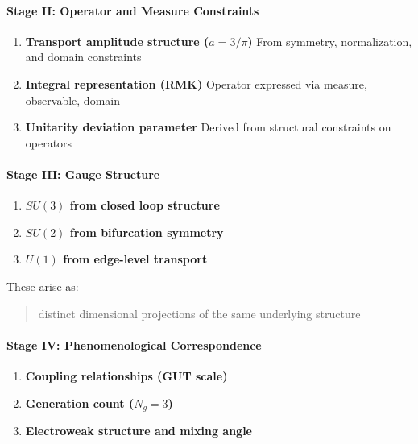 \documentclass[
]{article}
\providecommand{\tightlist}{%
  \setlength{\itemsep}{0pt}\setlength{\parskip}{0pt}}
\begin{document}
\hypertarget{stage-ii-operator-and-measure-constraints}{%
\paragraph{Stage II: Operator and Measure
Constraints}\label{stage-ii-operator-and-measure-constraints}}

\begin{enumerate}
\def\labelenumi{\arabic{enumi}.}
\setcounter{enumi}{4}
\item
  \textbf{Transport amplitude structure (\(a = 3/\pi\))} From symmetry,
  normalization, and domain constraints
\item
  \textbf{Integral representation (RMK)} Operator expressed via measure,
  observable, domain
\item
  \textbf{Unitarity deviation parameter} Derived from structural
  constraints on operators
\end{enumerate}

\hypertarget{stage-iii-gauge-structure}{%
\paragraph{Stage III: Gauge Structure}\label{stage-iii-gauge-structure}}

\begin{enumerate}
\def\labelenumi{\arabic{enumi}.}
\setcounter{enumi}{7}
\tightlist
\item
  \textbf{\(SU(3)\) from closed loop structure}
\item
  \textbf{\(SU(2)\) from bifurcation symmetry}
\item
  \textbf{\(U(1)\) from edge-level transport}
\end{enumerate}

These arise as:

\begin{quote}
distinct dimensional projections of the same underlying structure
\end{quote}

\hypertarget{stage-iv-phenomenological-correspondence}{%
\paragraph{Stage IV: Phenomenological
Correspondence}\label{stage-iv-phenomenological-correspondence}}

\begin{enumerate}
\def\labelenumi{\arabic{enumi}.}
\setcounter{enumi}{10}
\tightlist
\item
  \textbf{Coupling relationships (GUT scale)}
\item
  \textbf{Generation count (\(N_g = 3\))}
\item
  \textbf{Electroweak structure and mixing angle}
\end{enumerate}
\end{document}
